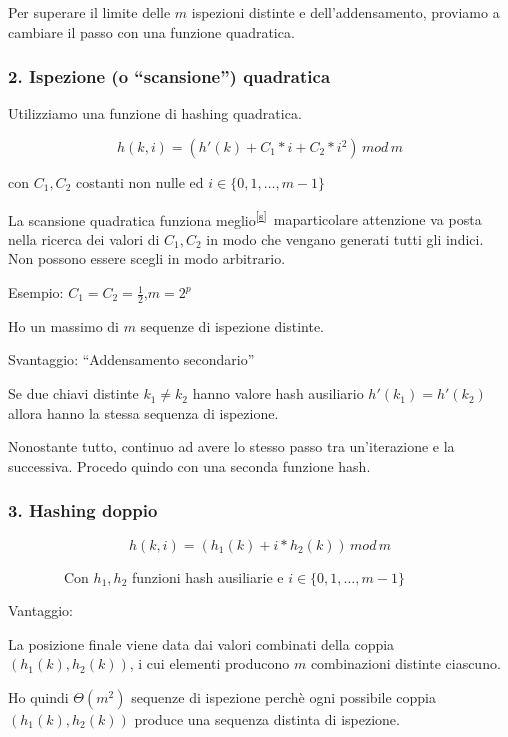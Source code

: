 \documentclass[tikz]{article}
\begin{document}
{Per superare il limite delle $m$ ispezioni distinte e dell'addensamento, proviamo a cambiare il passo con una funzione quadratica.}

\subsubsection{2. Ispezione (o ``scansione'') quadratica}

{Utilizziamo una funzione di hashing quadratica.}

\begin{equation}
h(k,i) = (h'(k) + C_1*i + C_2 * i^2)\,mod\,m
\end{equation}

{con $C_1,C_2$ costanti non nulle ed $i \in \{0,1,\ldots,m-1\}$}

{La scansione quadratica funziona meglio}\textsuperscript{\protect\hyperlink{cmnt19}{{[}s{]}}}{~maparticolare attenzione va posta nella ricerca dei valori di $C_1,C_2$ in modo che vengano generati tutti gli indici. Non possono essere scegli in modo arbitrario.}

{Esempio: $C_1=C_2=\frac{1}{2}$,$m=2^p$}

{Ho un massimo di $m$ sequenze di ispezione distinte.}

{Svantaggio}{: ``Addensamento secondario''}

{Se due chiavi distinte $k_1 \neq k_2$ hanno valore hash ausiliario $h'(k_1) = h'(k_2)$ allora hanno la stessa sequenza di ispezione.}

{Nonostante tutto, continuo ad avere lo stesso passo tra un'iterazione e la successiva. Procedo quindo con una seconda funzione hash.}

\subsubsection{3. Hashing doppio}

\begin{equation}
h(k,i) = (h_1(k) + i*h_2(k))\,mod\,m
\end{equation}		

{~~~~~~~~Con $h_1,h_2$ funzioni hash ausiliarie e $i \in \{0,1,\ldots,m-1\}$}

{Vantaggio:}

{La posizione finale viene data dai valori combinati della coppia $(h_1(k),h_2(k))$, i cui elementi producono $m$ combinazioni distinte ciascuno.}

{Ho quindi $\Theta(m^2)$ sequenze di ispezione perchè ogni possibile coppia $(h_1(k),h_2(k))$ produce una sequenza distinta di ispezione.}
\end{document}

